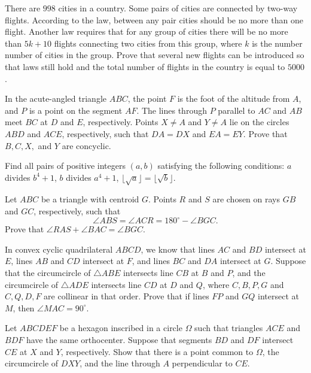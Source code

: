 \documentclass[11pt]{scrartcl}
\begin{document}
\begin{problem}[521339998508550]
There are $998$ cities in a country. Some pairs of cities are connected by two-way flights. According to the law, between any pair cities should be no more than one flight. Another law requires that for any group of cities there will be no more than $5k+10$ flights connecting two cities from this group, where $k$ is the number number of cities in the group. Prove that several new flights can be introduced so that laws still hold and the total number of flights in the country is equal to $5000$.
\end{problem}
\begin{problem}[5873161915777778529]
In the acute-angled triangle $ABC$, the point $F$ is the foot of the altitude from $A$, and $P$ is a point on the segment $AF$. The lines through $P$ parallel to $AC$ and $AB$ meet $BC$ at $D$ and $E$, respectively. Points $X \ne A$ and $Y \ne A$ lie on the circles $ABD$ and $ACE$, respectively, such that $DA = DX$ and $EA = EY$.
Prove that $B, C, X,$ and $Y$ are concyclic.
\end{problem}
\begin{problem}[600298381529685]
	Find all pairs of positive integers $(a,b)$ satisfying the following conditions:
$a$ divides $b^4+1$,
$b$ divides $a^4+1$,
$\lfloor\sqrt{a}\rfloor=\lfloor \sqrt{b}\rfloor$.
\end{problem}
\begin{problem}[284109588966873]
	Let $ABC$ be a triangle with centroid $G$. Points $R$ and $S$ are chosen on rays $GB$ and $GC$, respectively, such that
\[ \angle ABS=\angle ACR=180^\circ-\angle BGC.\]Prove that $\angle RAS+\angle BAC=\angle BGC$.
\end{problem}
\begin{problem}[6340105142765788083]
In convex cyclic quadrilateral $ABCD$, we know that lines $AC$ and $BD$ intersect at $E$, lines $AB$ and $CD$ intersect at $F$, and lines $BC$ and $DA$ intersect at $G$. Suppose that the circumcircle of $\triangle ABE$ intersects line $CB$ at $B$ and $P$, and the circumcircle of $\triangle ADE$ intersects line $CD$ at $D$ and $Q$, where $C,B,P,G$ and $C,Q,D,F$ are collinear in that order. Prove that if lines $FP$ and $GQ$ intersect at $M$, then $\angle MAC = 90^\circ$.
\end{problem}
\begin{problem}[639126468624733]
Let $ABCDEF$ be a hexagon inscribed in a circle $\Omega$ such that triangles $ACE$ and $BDF$ have the same orthocenter. Suppose that segments $BD$ and $DF$ intersect $CE$ at $X$ and $Y$, respectively. Show that there is a point common to $\Omega$, the circumcircle of $DXY$, and the line through $A$ perpendicular to $CE$.
\end{problem}
\end{document}
